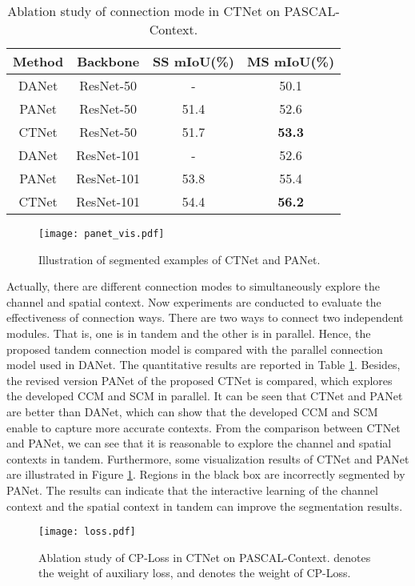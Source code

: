 \documentclass[10pt,journal,cspaper,compsoc]{IEEEtran}
\begin{document}
\begin{table}[t]
\caption{Ablation study of connection mode in CTNet on PASCAL-Context.}
	\label{table6}
		\renewcommand\arraystretch{1.3}
		\centering
		\begin{tabular}{c|c|c|c}
			\hline
			Method &Backbone&SS mIoU(\%) &MS mIoU(\%)\\
			\hline
			DANet \cite{fu2019dual}&ResNet-50&-&50.1\\
			PANet & ResNet-50& 51.4&52.6\\
			CTNet& ResNet-50&51.7&\textbf{53.3}\\
			\hline
			DANet \cite{fu2019dual} &ResNet-101 &-&52.6\\
			PANet & ResNet-101 &53.8&55.4\\
			CTNet& ResNet-101&54.4&\textbf{56.2}\\
			\hline
	\end{tabular}
\end{table}

\begin{figure}
		\centering
		\texttt{[image: panet\_vis.pdf]}
		\caption{Illustration of segmented examples of CTNet and PANet.}
		\label{fig10}
\vspace{-4mm}
\end{figure}

Actually, there are different connection modes to simultaneously explore the channel and spatial context. Now experiments are conducted to evaluate the effectiveness of connection ways. There are two ways to connect two independent modules. That is, one is in tandem and the other is in parallel. Hence, the proposed tandem connection model is compared with the parallel connection model used in DANet. The quantitative results are reported in Table \ref{table6}. Besides, the revised version PANet of the proposed CTNet is compared, which explores the developed CCM and SCM in parallel. It can be seen that CTNet and PANet are better than DANet, which can show that the developed CCM and SCM enable to capture more accurate contexts. From the comparison between CTNet and PANet, we can see that it is reasonable to explore the channel and spatial contexts in tandem. Furthermore, some visualization results of CTNet and PANet are illustrated in Figure \ref{fig10}. Regions in the black box are incorrectly segmented by PANet. The results can indicate that the interactive learning of the channel context and the spatial context in tandem can improve the segmentation results.

\begin{figure}
		\centering
		\texttt{[image: loss.pdf]}
		\caption{Ablation study of CP-Loss in CTNet on PASCAL-Context.  denotes the weight of auxiliary loss, and  denotes the weight of CP-Loss.}
		\label{fig11}
\end{figure}
	
\end{document}

